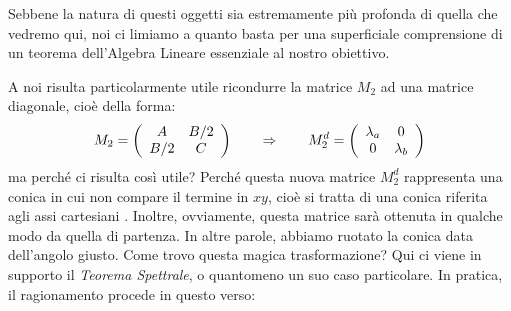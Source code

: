 \documentclass[a4paper, oneside]{article}
\begin{document}
		Sebbene la natura di questi oggetti sia estremamente più profonda di quella che vedremo qui, noi ci limiamo a quanto basta per una superficiale comprensione di un teorema dell'Algebra Lineare essenziale al nostro obiettivo.
		
		A noi risulta particolarmente utile ricondurre la matrice $M_2$ ad una matrice diagonale, cioè della forma:
		\begin{equation*}
			M_2 =\left(
			\begin{array}{cc}
				A & B/2 \\
				B/2 & C
			\end{array} \right) \qquad \Rightarrow \qquad
			M_2^d =\left(
			\begin{array}{cc}
				\lambda_a & 0 \\
				0 & \lambda_b
			\end{array} \right)
		\end{equation*}
		ma perché ci risulta così utile? Perché questa nuova matrice $M_2^d$ rappresenta una conica in cui non compare il termine in $xy$, cioè si tratta di una conica riferita agli assi cartesiani . Inoltre, ovviamente, questa matrice sarà ottenuta in qualche modo da quella di partenza. In altre parole, abbiamo ruotato la conica data dell'angolo giusto.
		Come trovo questa magica trasformazione? Qui ci viene in supporto il \emph{Teorema Spettrale}, o quantomeno un suo caso particolare. In pratica, il ragionamento procede in questo verso:
\end{document}
